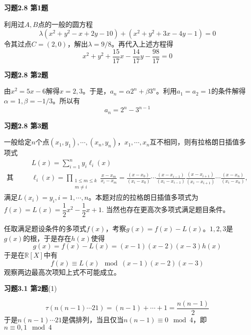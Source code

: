 \renewcommand{\newpageorvspace}{\vspace{2em}}

\date{第六次作业}



\maketitle

{\bf 习题2.8 第1题}

利用过$A,B$点的一般的圆方程
$$\lambda (x^2+y^2-x+2y-10) + (x^2+y^2+3x-4y-1) = 0$$
令其过点$C = (2,0)$，解出$\lambda = 9/8$。再代入上述方程得
$$x^2+y^2+\dfrac{15}{17}x-\dfrac{14}{17}y-\dfrac{98}{17}=0$$

\newpageorvspace

{\bf 习题2.8 第2题}

由$x^2 = 5x - 6$解得$x = 2,3$。于是，$a_n = \alpha 2^n + \beta3^n$。利用$a_1=a_2=1$的条件解得$\alpha = 1, \beta = -1/3$。所以有
$$a_n = 2^n - 3^{n-1}$$

\newpageorvspace

{\bf 习题2.8 第3题}

一般给定$n$个点$(x_1,y_1),\cdots,(x_n,y_n)$，$x_1,\cdots,x_n$互不相同，则有拉格朗日插值多项式
\begin{align*}
& L(x) = \sum_{i=1}^{n}y_{i}\ell_{i}(x) \\
\text{其中，} & \ell_{i}(x) = \prod_{\begin{smallmatrix}1\leq m\leq k\\m\neq i\end{smallmatrix}}{\frac {x-x_{m}}{x_{i}-x_{m}}}={\frac {(x-x_{0})}{(x_{i}-x_{0})}}\cdots {\frac {(x-x_{i-1})}{(x_{i}-x_{i-1})}}{\frac {(x-x_{i+1})}{(x_{i}-x_{i+1})}}\cdots {\frac {(x-x_{n})}{(x_{i}-x_{n})}},
\end{align*}
满足$L(x_i) = y_i, i=1,\cdots,n$。本题对应的拉格朗日插值多项式为$f(x) = L(x) = \dfrac{1}{2}x^2 - \dfrac{1}{2}x + 1$. 当然也存在更高次多项式满足题目条件。

任取满足题设条件的多项式$f(x)$，考察$g(x) = f(x) - L(x)$。$1,2,3$是$g(x)$的根，于是存在$h(x)$使得
$$g(x) = f(x) - L(x) = (x-1)(x-2)(x-3) h(x)$$
于是在$\mathbb{R}[X]$中有
$$f(x) \equiv L(x) \mod (x-1)(x-2)(x-3)$$
观察两边最高次项知上式不可能成立。

\newpageorvspace

{\bf 习题3.1 第2题}(1)

$$\tau(n(n-1)\cdots 21) = (n-1) + \cdots + 1 = \dfrac{n(n-1)}{2}$$
于是$n(n-1)\cdots 21$是偶排列，当且仅当$n(n-1)\equiv 0 \mod 4$，即$n\equiv 0,1 \mod 4$

